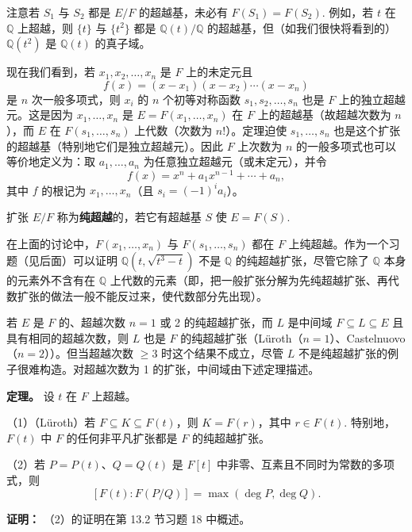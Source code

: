 注意若 \(S_1\) 与 \(S_2\) 都是 \(E/F\) 的超越基，未必有 \(F(S_1) = F(S_2)\). 例如，若 \(t\) 在 \(\mathbb{Q}\) 上超越，则 \(\{t\}\) 与 \(\{t^2\}\) 都是 \(\mathbb{Q}(t)/\mathbb{Q}\) 的超越基，但（如我们很快将看到的）\(\mathbb{Q}(t^2)\) 是 \(\mathbb{Q}(t)\) 的真子域。

现在我们看到，若 \(x_1, x_2, \ldots, x_n\) 是 \(F\) 上的未定元且
\[
f(x) = (x-x_1)(x-x_2)\cdots(x-x_n) \tag{14.28}
\]
是 \(n\) 次一般多项式，则 \(x_i\) 的 \(n\) 个初等对称函数 \(s_1, s_2, \ldots, s_n\) 也是 \(F\) 上的独立超越元。这是因为 \(x_1, \ldots, x_n\) 是 \(E = F(x_1, \ldots, x_n)\) 在 \(F\) 上的超越基（故超越次数为 \(n\)），而 \(E\) 在 \(F(s_1, \ldots, s_n)\) 上代数（次数为 \(n!\)）。定理迫使 \(s_1, \ldots, s_n\) 也是这个扩张的超越基（特别地它们是独立超越元）。因此 \(F\) 上次数为 \(n\) 的一般多项式也可以等价地定义为：取 \(a_1, \ldots, a_n\) 为任意独立超越元（或未定元），并令
\[
f(x) = x^n+a_1x^{n-1}+\cdots+a_n, \tag{14.29}
\]
其中 \(f\) 的根记为 \(x_1, \ldots, x_n\)（且 \(s_i = (-1)^ia_i\)）。

\begin{definition}
扩张 \(E/F\) 称为\textbf{纯超越}的，若它有超越基 \(S\) 使 \(E = F(S)\).
\end{definition}

在上面的讨论中，\(F(x_1, \ldots, x_n)\) 与 \(F(s_1, \ldots, s_n)\) 都在 \(F\) 上纯超越。作为一个习题（见后面）可以证明 \(\mathbb{Q}(t, \sqrt{t^3-t})\) 不是 \(\mathbb{Q}\) 的纯超越扩张，尽管它除了 \(\mathbb{Q}\) 本身的元素外不含有在 \(\mathbb{Q}\) 上代数的元素（即，把一般扩张分解为先纯超越扩张、再代数扩张的做法一般不能反过来，使代数部分先出现）。

若 \(E\) 是 \(F\) 的、超越次数 \(n = 1\) 或 2 的纯超越扩张，而 \(L\) 是中间域 \(F \subseteq L \subseteq E\) 且具有相同的超越次数，则 \(L\) 也是 \(F\) 的纯超越扩张（Lüroth（\(n = 1\)）、Castelnuovo（\(n = 2\)））。但当超越次数 \(\geq 3\) 时这个结果不成立，尽管 \(L\) 不是纯超越扩张的例子很难构造。对超越次数为 1 的扩张，中间域由下述定理描述。

\noindent\textbf{定理。} 设 \(t\) 在 \(F\) 上超越。

（1）（Lüroth）若 \(F \subseteq K \subseteq F(t)\)，则 \(K = F(r)\)，其中 \(r \in F(t)\). 特别地，\(F(t)\) 中 \(F\) 的任何非平凡扩张都是 \(F\) 的纯超越扩张。

（2）若 \(P = P(t)\)、\(Q = Q(t)\) 是 \(F[t]\) 中非零、互素且不同时为常数的多项式，则
\[
[F(t):F(P/Q)] = \max(\deg P, \deg Q).
\]

\noindent\textbf{证明：} （2）的证明在第 13.2 节习题 18 中概述。

